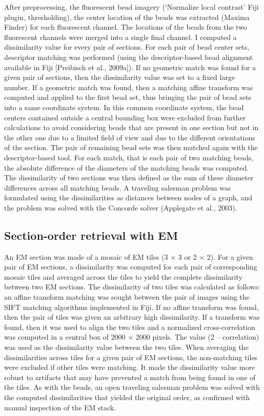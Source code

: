 \documentclass{article}
\begin{document}
After preprocessing, the fluorescent bead imagery (‘Normalize local contrast’ Fiji plugin, thresholding), the center location of the beads was extracted (Maxima Finder) for each fluorescent channel. The locations of the beads from the two fluorescent channels were merged into a single final channel. I computed a dissimilarity value for every pair of sections. For each pair of bead center sets, descriptor matching was performed (using the descriptor-based bead alignment available in Fiji [Preibisch et al., 2009a]). If no geometric match was found for a given pair of sections, then the dissimilarity value was set to a fixed large number. If a geometric match was found, then a matching affine transform was computed and applied to the first bead set, thus bringing the pair of bead sets into a same coordinate system. In this common coordinate system, the bead centers contained outside a central bounding box were excluded from further calculations to avoid considering beads that are present in one section but not in the other one due to a limited field of view and due to the different orientations of the section. The pair of remaining bead sets was then matched again with the descriptor-based tool. For each match, that is each pair of two matching beads, the absolute difference of the diameters of the matching beads was computed. The dissimilarity of two sections was then defined as the sum of these diameter differences across all matching beads. A traveling salesman problem was formulated using the dissimilarities as distances between nodes of a graph, and the problem was solved with the Concorde solver (Applegate et al., 2003).

\subsection*{Section-order retrieval with EM}

An EM section was made of a mosaic of EM tiles (3 × 3 or 2 × 2). For a given pair of EM sections, a dissimilarity was computed for each pair of corresponding mosaic tiles and averaged across the tiles to yield the complete dissimilarity between two EM sections. The dissimilarity of two tiles was calculated as follows: an affine transform matching was sought between the pair of images using the SIFT matching algorithms implemented in Fiji. If no affine transform was found, then the pair of tiles was given an arbitrary high dissimilarity. If a transform was found, then it was used to align the two tiles and a normalized cross-correlation was computed in a central box of 2000 × 2000 pixels. The value (2 – correlation) was used as the dissimilarity value between the two tiles. When averaging the dissimilarities across tiles for a given pair of EM sections, the non-matching tiles were excluded if other tiles were matching. It made the dissimilarity value more robust to artifacts that may have prevented a match from being found in one of the tiles. As with the beads, an open traveling salesman problem was solved with the computed dissimilarities that yielded the original order, as confirmed with manual inspection of the EM stack.
\end{document}
